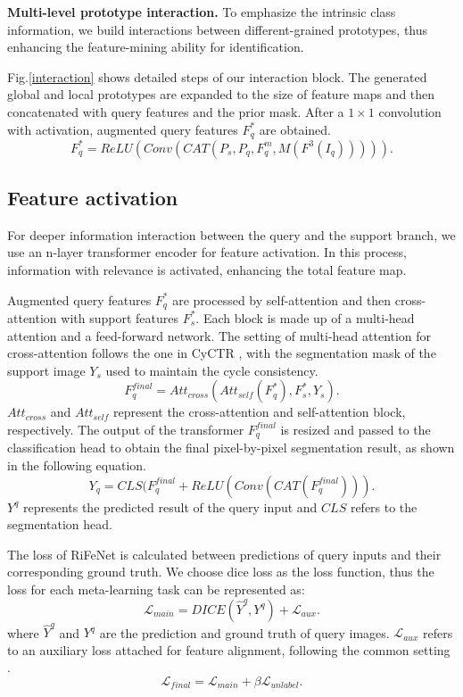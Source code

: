 \documentclass[letterpaper]{article} %
\begin{document}
\textbf{Multi-level prototype interaction.}
To emphasize the intrinsic class information, we build interactions between different-grained prototypes, thus enhancing the feature-mining ability for identification.

Fig.\ref{interaction} shows detailed steps of our interaction block. The generated global and local prototypes are expanded to the size of feature maps and then concatenated with query features and the prior mask. After a $1\times1$ convolution with activation, augmented query features $F^{*}_q$ are obtained.
\begin{equation}
	 F^{*}_q = ReLU(Conv(CAT(P_s,P_q,F^{m}_q,M(F^3(I_q))))).
\end{equation}%

\subsection{Feature activation}
For deeper information interaction between the query and the support branch, we use an n-layer transformer encoder for feature activation. In this process, information with relevance is activated, enhancing the total feature map.

Augmented query features $F^{*}_q$ are processed by self-attention and then cross-attention with support features $F^{*}_s$. Each block is made up of a multi-head attention and a feed-forward network. The setting of multi-head attention for cross-attention follows the one in CyCTR \cite{zhang2021few}, with the segmentation mask of the support image $Y_s$ used to maintain the cycle consistency.
\begin{equation}
	F^{final}_q = Att_{cross}(Att_{self}(F^{*}_q),F^{*}_s,Y_s).
\end{equation}%
$Att_{cross}$ and $Att_{self}$ represent the cross-attention and self-attention block, respectively. The output of the transformer $F^{final}_q$ is resized and passed to the classification head to obtain the final pixel-by-pixel segmentation result, as shown in the following equation.
\begin{equation}
	Y_q = CLS(F^{final}_q+ReLU(Conv(CAT(F^{final}_q))).
\end{equation}%
$Y^q$ represents the predicted result of the query input and $CLS$ refers to the segmentation head.

The loss of RiFeNet is calculated between predictions of query inputs and their corresponding ground truth. We choose dice loss as the loss function, thus the loss for each meta-learning task can be represented as:
\begin{equation}
            \mathcal{L}_{main} = DICE (\hat{Y}^q,Y^q) + \mathcal{L}_{aux}.
\end{equation}%
where $\hat{Y}^q$ and ${Y}^q$ are the prediction and ground truth of query images. $\mathcal{L}_{aux}$ refers to an auxiliary loss attached for feature alignment, following the common setting \cite{milletari2016v}.
\begin{equation}
            \mathcal{L}_{final} = \mathcal{L}_{main} + \beta \mathcal{L}_{unlabel}.
\end{equation}%
\end{document}

